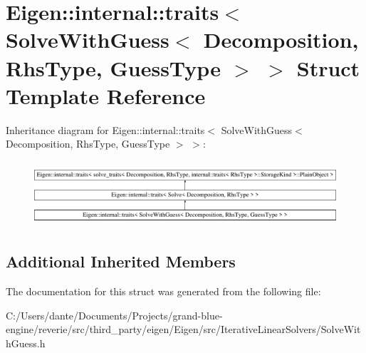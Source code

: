 \hypertarget{struct_eigen_1_1internal_1_1traits_3_01_solve_with_guess_3_01_decomposition_00_01_rhs_type_00_01_guess_type_01_4_01_4}{}\section{Eigen\+::internal\+::traits$<$ Solve\+With\+Guess$<$ Decomposition, Rhs\+Type, Guess\+Type $>$ $>$ Struct Template Reference}
\label{struct_eigen_1_1internal_1_1traits_3_01_solve_with_guess_3_01_decomposition_00_01_rhs_type_00_01_guess_type_01_4_01_4}
Inheritance diagram for Eigen\+::internal\+::traits$<$ Solve\+With\+Guess$<$ Decomposition, Rhs\+Type, Guess\+Type $>$ $>$\+:\begin{figure}[H]
\begin{center}
\leavevmode
\includegraphics[height=2.441860cm]{struct_eigen_1_1internal_1_1traits_3_01_solve_with_guess_3_01_decomposition_00_01_rhs_type_00_01_guess_type_01_4_01_4}
\end{center}
\end{figure}
\subsection*{Additional Inherited Members}


The documentation for this struct was generated from the following file\+:\begin{DoxyCompactItemize}
\item 
C\+:/\+Users/dante/\+Documents/\+Projects/grand-\/blue-\/engine/reverie/src/third\+\_\+party/eigen/\+Eigen/src/\+Iterative\+Linear\+Solvers/Solve\+With\+Guess.\+h\end{DoxyCompactItemize}
